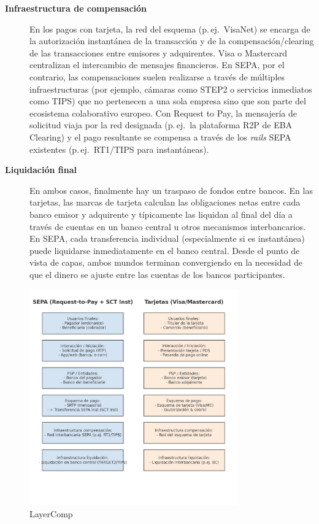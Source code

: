 \begin{description}
  \item[\textbf{Infraestructura de compensación}]
    En los pagos con tarjeta, la red del esquema (p.\,ej.\ VisaNet) se encarga de la autorización instantánea de la transacción y de la compensación/clearing de las transacciones entre emisores y adquirentes. Visa o Mastercard centralizan el intercambio de mensajes financieros. En SEPA, por el contrario, las compensaciones suelen realizarse a través de múltiples infraestructuras (por ejemplo, cámaras como STEP2 o servicios inmediatos como TIPS) que no pertenecen a una sola empresa sino que son parte del ecosistema colaborativo europeo. Con Request to Pay, la mensajería de solicitud viaja por la red designada (p.\,ej.\ la plataforma R2P de EBA Clearing) y el pago resultante se compensa a través de los \emph{rails} SEPA existentes (p.\,ej.\ RT1/TIPS para instantáneas).

  \item[\textbf{Liquidación final}]
    En ambos casos, finalmente hay un traspaso de fondos entre bancos. En las tarjetas, las marcas de tarjeta calculan las obligaciones netas entre cada banco emisor y adquirente y típicamente las liquidan al final del día a través de cuentas en un banco central u otros mecanismos interbancarios. En SEPA, cada transferencia individual (especialmente si es instantánea) puede liquidarse inmediatamente en el banco central. Desde el punto de vista de capas, ambos mundos terminan convergiendo en la necesidad de que el dinero se ajuste entre las cuentas de los bancos participantes.
\end{description}

\begin{figure}[H]
  \centering
  \includegraphics[width=0.8\textwidth]{Imagenes/LayerComp.png}
  \caption{LayerComp}
  \label{fig:Esquema por capas comparación}
\end{figure}

